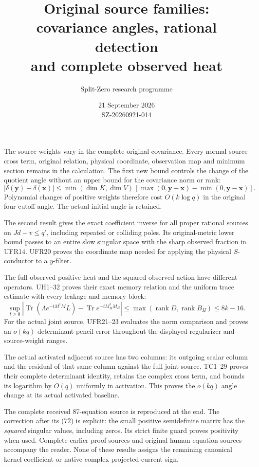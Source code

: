\documentclass[11pt]{article}
\title{Original source families:\\covariance angles, rational detection\\and complete observed heat}
\author{Split-Zero research programme}\date{21 September 2026\\SZ-20260921-014}
\begin{document}
\maketitle
The source weights vary in the complete original covariance. Every
normal-source cross term, original relation, physical coordinate,
observation map and minimum section remains in the calculation.
The first new bound controls the change of the quotient angle without
an upper bound for the covariance norm or rank:
\[
|\delta(\mathbf y)-\delta(\mathbf x)|\le
\min(\dim K,\dim V)\,[\max(0,\mathbf y-\mathbf x)-\min(0,\mathbf y-\mathbf x)].
\]
Polynomial changes of positive weights therefore cost $O(k\log q)$ in
the original four-cutoff angle. The actual initial angle is retained.

The second result gives the exact coefficient inverse for all proper
rational sources on $Jd-v\le q'$, including repeated or colliding poles.
Its original-metric lower bound passes to an entire slow singular space
with the sharp observed fraction in UFR14. UFR20 proves the coordinate
map needed for applying the physical $S$-conductor to a $y$-filter.

The full observed positive heat and the squared observed action have
different operators. UH1--32 proves their exact memory relation and
the uniform trace estimate with every leakage and memory block:
\[
\sup_{t\ge0}\left|\operatorname{Tr}(\Lambda e^{-tM^\dagger M}L)
 -\operatorname{Tr}e^{-tM_B^\dagger M_B}\right|
\le\max(\operatorname{rank}D,\operatorname{rank}B_H)\le8k-16.
\]
For the actual joint source, UFR21--23 evaluates the norm comparison
and proves an $o(kq)$ determinant-pencil error throughout the displayed
regularizer and source-weight ranges.

The actual activated adjacent source has two columns: its outgoing
scalar column and the residual of that same column against the full
joint source. TC1--29 proves their complete determinant identity,
retains the complex cross term, and bounds its logarithm by $O(q)$
uniformly in activation. This proves the $o(kq)$ angle change at its
actual activated baseline.

The complete received 87-equation source is reproduced at the end.
The correction after its (72) is explicit: the small positive
semidefinite matrix has the \emph{squared} singular values, including
zeros. Its strict finite guard proves positivity when used.
Complete earlier proof sources and original human equation sources
accompany the reader. None of these results assigns the remaining
canonical kernel coefficient or native complex projected-current sign.
\tableofcontents\clearpage
\end{document}
